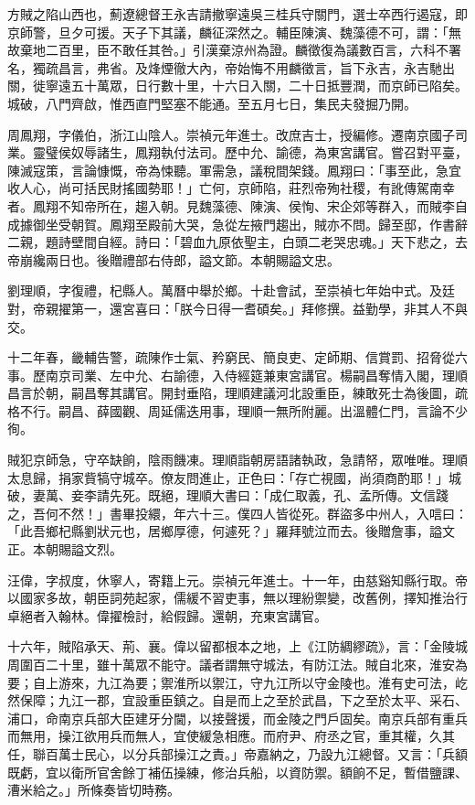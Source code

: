 \begin{pinyinscope}
方賊之陷山西也，薊遼總督王永吉請撤寧遠吳三桂兵守關門，選士卒西行遏寇，即京師警，旦夕可援。天子下其議，麟征深然之。輔臣陳演、魏藻德不可，謂：「無故棄地二百里，臣不敢任其咎。」引漢棄涼州為證。麟徵復為議數百言，六科不署名，獨疏昌言，弗省。及烽煙徹大內，帝始悔不用麟徵言，旨下永吉，永吉馳出關，徙寧遠五十萬眾，日行數十里，十六日入關，二十日抵豐潤，而京師已陷矣。城破，八門齊啟，惟西直門堅塞不能通。至五月七日，集民夫發掘乃開。

周鳳翔，字儀伯，浙江山陰人。崇禎元年進士。改庶吉士，授編修。遷南京國子司業。靈璧侯奴辱諸生，鳳翔執付法司。歷中允、諭德，為東宮講官。嘗召對平臺，陳滅寇策，言論慷慨，帝為悚聽。軍需急，議稅間架錢。鳳翔曰：「事至此，急宜收人心，尚可括民財搖國勢耶！」亡何，京師陷，莊烈帝殉社稷，有訛傳駕南幸者。鳳翔不知帝所在，趨入朝。見魏藻德、陳演、侯恂、宋企郊等群入，而賊李自成據御坐受朝賀。鳳翔至殿前大哭，急從左掖門趨出，賊亦不問。歸至邸，作書辭二親，題詩壁間自經。詩曰：「碧血九原依聖主，白頭二老哭忠魂。」天下悲之，去帝崩纔兩日也。後贈禮部右侍郎，謚文節。本朝賜謚文忠。

劉理順，字復禮，杞縣人。萬曆中舉於鄉。十赴會試，至崇禎七年始中式。及廷對，帝親擢第一，還宮喜曰：「朕今日得一耆碩矣。」拜修撰。益勤學，非其人不與交。

十二年春，畿輔告警，疏陳作士氣、矜窮民、簡良吏、定師期、信賞罰、招脅從六事。歷南京司業、左中允、右諭德，入侍經筵兼東宮講官。楊嗣昌奪情入閣，理順昌言於朝，嗣昌奪其講官。開封垂陷，理順建議河北設重臣，練敢死士為後圖，疏格不行。嗣昌、薛國觀、周延儒迭用事，理順一無所附麗。出溫體仁門，言論不少徇。

賊犯京師急，守卒缺餉，陰雨饑凍。理順詣朝房語諸執政，急請帑，眾唯唯。理順太息歸，捐家貲犒守城卒。僚友問進止，正色曰：「存亡視國，尚須商酌耶！」城破，妻萬、妾李請先死。既絕，理順大書曰：「成仁取義，孔、孟所傳。文信踐之，吾何不然！」書畢投繯，年六十三。僕四人皆從死。群盜多中州人，入唁曰：「此吾鄉杞縣劉狀元也，居鄉厚德，何遽死？」羅拜號泣而去。後贈詹事，謚文正。本朝賜謚文烈。

汪偉，字叔度，休寧人，寄籍上元。崇禎元年進士。十一年，由慈谿知縣行取。帝以國家多故，朝臣詞苑起家，儒緩不習吏事，無以理紛禦變，改舊例，擇知推治行卓絕者入翰林。偉擢檢討，給假歸。還朝，充東宮講官。

十六年，賊陷承天、荊、襄。偉以留都根本之地，上《江防綢繆疏》，言：「金陵城周圍百二十里，雖十萬眾不能守。議者謂無守城法，有防江法。賊自北來，淮安為要；自上游來，九江為要；禦淮所以禦江，守九江所以守金陵也。淮有史可法，屹然保障；九江一郡，宜設重臣鎮之。自是而上之至於武昌，下之至於太平、采石、浦口，命南京兵部大臣建牙分閫，以接聲援，而金陵之門戶固矣。南京兵部有重兵而無用，操江欲用兵而無人，宜使緩急相應。而府尹、府丞之官，重其權，久其任，聯百萬士民心，以分兵部操江之責。」帝嘉納之，乃設九江總督。又言：「兵額既虧，宜以衛所官舍餘丁補伍操練，修治兵船，以資防禦。額餉不足，暫借鹽課、漕米給之。」所條奏皆切時務。


\end{pinyinscope}

